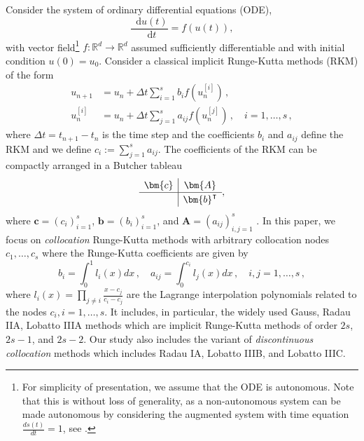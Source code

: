 \documentclass[sn-mathphys-num]{sn-jnl}%
\newcommand*\diff{\mathop{}\!\mathrm{d}}
\newcommand{\reva}[1]{#1}%
\theoremstyle{thmstyleone}%
\theoremstyle{thmstyletwo}%
\theoremstyle{thmstylethree}%
\begin{document}
Consider the system of ordinary differential equations (ODE),
\begin{equation}
    \frac{\diff u(t)}{\diff t} = f(u(t)),
	\label{IVP}
\end{equation}
with vector field\footnote{For simplicity of presentation, we assume that the ODE is autonomous. Note that this is without loss of generality, as a non-autonomous system can be made autonomous by considering the augmented system with time equation $\frac{ds(t)}{dt} = 1$, see \citep[Section III.1.1]{HairerEtAl2002_geometric}.} $f: \mathbb{R}^d \to \mathbb{R}^d$ assumed sufficiently differentiable and with initial condition $u(0) = u_0$.
Consider a classical implicit Runge-Kutta methods (RKM) of the form
\begin{subequations}
\begin{align}
		u_{n+1} &= u_n + \Delta t \sum_{i=1}^s b_i f(u_n^{[i]} )\label{ButcherUpdate} \,, \\
		u_n^{[i]} &=u_n + \Delta t \sum_{j=1}^s a_{ij} f(u_n^{[j]} ) \,, \quad i = 1, \dots, s \,,
	\label{ButcherForm}
\end{align}
\end{subequations}
where $\Delta t = t_{n+1}- t_n$ is the time step and the coefficients $b_i$ and $a_{ij}$  define the RKM and we define $c_i := \sum_{j=1}^s a_{ij}$. 
The coefficients of the RKM can be compactly arranged in a Butcher tableau
\begin{equation*}
\renewcommand\arraystretch{1.2}
\begin{array}
{c|c}
\bm{c} & \bm{A}\\
\hline
&\bm{b}^\intercal
\end{array},
\label{ButcherTableau}
\end{equation*}
where $\bm{c} = (c_i)_{i=1}^s$, $\bm{b} = (b_i)_{i=1}^s$, and $\bm{A} = (a_{ij})_{i,j=1}^s$ \citep{Butcher1964a}. In this paper, we focus on \emph{collocation} Runge-Kutta methods \citep[Section II.1.2]{HairerEtAl2002_geometric} with arbitrary collocation nodes $c_1, \ldots, c_s$ where the Runge-Kutta coefficients are given by
\[ b_i = \int_{0}^1 l_i(x) dx \,, \quad a_{ij} = \int_{0}^{c_i} l_j(x) dx \,, \quad i, j = 1, \dots, s \,, \]
where $l_i(x) = \prod_{j\neq i} \frac{x - c_j}{c_i - c_j}$ are the Lagrange interpolation polynomials related to the nodes $c_i, i=1, \dots, s$. It includes, in particular, the widely used Gauss, Radau IIA, Lobatto IIIA methods which are implicit Runge-Kutta methods of order $2s$, $2s - 1$, and $2s - 2$. \reva{Our study also includes the variant of \emph{discontinuous collocation} methods \citep[Section II.1.2]{HairerEtAl2002_geometric} which includes Radau IA, Lobatto IIIB, and Lobatto IIIC.}
\end{document}
